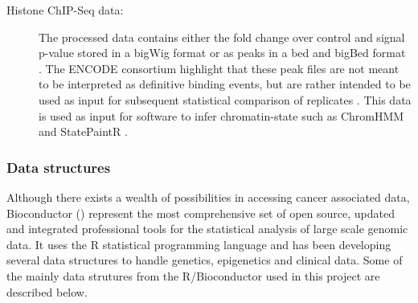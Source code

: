 \begin{description}
  \item [Histone ChIP-Seq data:] The processed data contains either the fold change over control and signal p-value stored
  in a bigWig format or as peaks in a bed and bigBed format \cite{ENCODE_chipseq}.  The ENCODE consortium highlight that these peak files are not meant to be interpreted as definitive binding events, but are rather intended to be used as input for subsequent statistical comparison of replicates \cite{ENCODE_chipseq}. This data is used as input for software
   to infer chromatin-state such as ChromHMM \cite{ernst2012chromhmm} and StatePaintR \cite{statepaintr}.
\end{description}


\subsubsection{Data structures}
Although there exists a wealth of possibilities \cite{kannan2015public}
in accessing cancer associated data, Bioconductor ()
represent the most comprehensive set of open source,
updated and integrated professional tools for the statistical analysis of large scale genomic data.
It uses the R statistical programming language and has been developing several
data structures to handle genetics, epigenetics and clinical data.
Some of the mainly data strutures from the R/Bioconductor used in this project are described below.

